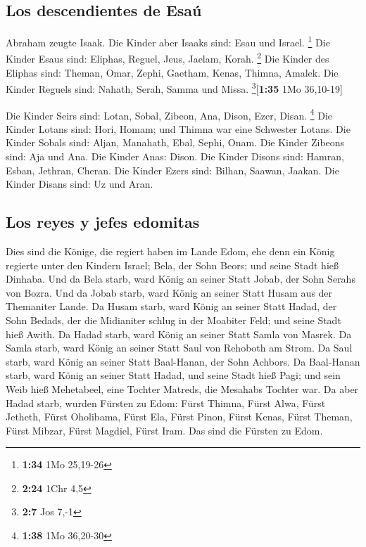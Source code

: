 \hypertarget{los-descendientes-de-esauxfa}{%
\subsection{Los descendientes de
Esaú}\label{los-descendientes-de-esauxfa}}

 Abraham zeugte Isaak. Die Kinder aber Isaaks sind: Esau
und Israel. \footnote{\textbf{1:34} 1Mo 25,19-26}  Die
Kinder Esaus sind: Eliphas, Reguel, Jeus, Jaelam, Korah. \footnote{\textbf{2:24}
  1Chr 4,5}  Die Kinder des Eliphas sind: Theman, Omar,
Zephi, Gaetham, Kenas, Thimna, Amalek.  Die Kinder
Reguels sind: Nahath, Serah, Samma und Missa.
\footnote{\textbf{2:7} Jos 7,-1}{[}\textbf{1:35} 1Mo 36,10-19{]}

 Die Kinder Seirs sind: Lotan, Sobal, Zibeon, Ana, Dison,
Ezer, Disan. \footnote{\textbf{1:38} 1Mo 36,20-30}  Die
Kinder Lotans sind: Hori, Homam; und Thimna war eine Schwester Lotans.
 Die Kinder Sobals sind: Aljan, Manahath, Ebal, Sephi,
Onam. Die Kinder Zibeons sind: Aja und Ana.  Die Kinder
Anas: Dison. Die Kinder Disons sind: Hamran, Esban, Jethran, Cheran.
 Die Kinder Ezers sind: Bilhan, Saawan, Jaakan. Die
Kinder Disans sind: Uz und Aran.

\hypertarget{los-reyes-y-jefes-edomitas}{%
\subsection{Los reyes y jefes
edomitas}\label{los-reyes-y-jefes-edomitas}}

 Dies sind die Könige, die regiert haben im Lande Edom,
ehe denn ein König regierte unter den Kindern Israel; Bela, der Sohn
Beors; und seine Stadt hieß Dinhaba.  Und da Bela starb,
ward König an seiner Statt Jobab, der Sohn Serahs von Bozra.
 Und da Jobab starb, ward König an seiner Statt Husam aus
der Themaniter Lande.  Da Husam starb, ward König an
seiner Statt Hadad, der Sohn Bedads, der die Midianiter schlug in der
Moabiter Feld; und seine Stadt hieß Awith.  Da Hadad
starb, ward König an seiner Statt Samla von Masrek.  Da
Samla starb, ward König an seiner Statt Saul von Rehoboth am Strom.
 Da Saul starb, ward König an seiner Statt Baal-Hanan,
der Sohn Achbors.  Da Baal-Hanan starb, ward König an
seiner Statt Hadad, und seine Stadt hieß Pagi; und sein Weib hieß
Mehetabeel, eine Tochter Matreds, die Mesahabs Tochter war.
 Da aber Hadad starb, wurden Fürsten zu Edom: Fürst
Thimna, Fürst Alwa, Fürst Jetheth,  Fürst Oholibama,
Fürst Ela, Fürst Pinon,  Fürst Kenas, Fürst Theman, Fürst
Mibzar,  Fürst Magdiel, Fürst Iram. Das sind die Fürsten
zu Edom.

